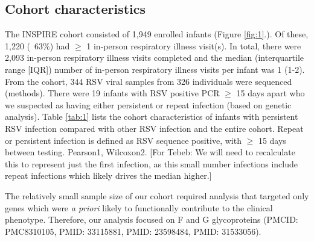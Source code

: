 \documentclass{article}
\begin{document}
\subsection{Cohort characteristics}
The INSPIRE cohort consisted of 1,949 enrolled infants 
(Figure \ref{fig:1}.).
Of these, 1,220 (~63\%) had $\ge$ 1 in-person respiratory illness visit(s). 
In total, there were 2,093 in-person respiratory illness visits completed and the median (interquartile range [IQR]) number of in-person respiratory illness visits per infant was 1 (1-2). 
From the cohort, 344 RSV viral samples from 326 individuals were sequenced (methods).
There were 19 infants with RSV positive PCR $\ge$ 15 days apart who we suspected as having either persistent or repeat infection (based on genetic analysis).
Table \ref{tab:1} lists the cohort characteristics of infants with persistent RSV infection compared with other RSV infection and the entire cohort. 
Repeat or persistent infection is defined as RSV sequence positive, with $\ge$ 15 days between testing. Pearson1, Wilcoxon2.
[For Tebeb: We will need to recalculate this to represent just the first infection, as this small number infections include repeat infections which likely drives the median higher.]

The relatively small sample size of our cohort required analysis that targeted only genes which were \textit{a priori} likely to functionally contribute to the clinical phenotype. 
Therefore, our analysis focused on F and G glycoproteins (PMCID: PMC8310105, PMID: 33115881, PMID: 23598484, PMID: 31533056).
\end{document}

